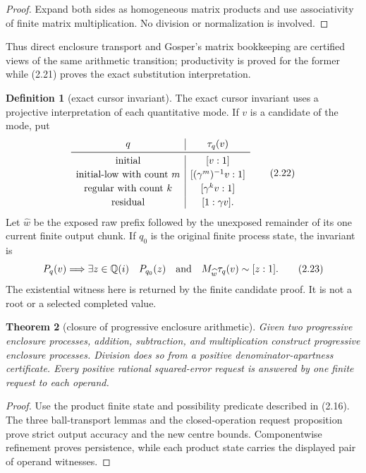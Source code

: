 \documentclass[10pt]{article}
\newtheorem{theorem}{Theorem}[section]
\theoremstyle{definition}
\newtheorem{definition}[theorem]{Definition}
\theoremstyle{remark}
\newcommand{\Qi}{\mathbb{Q}(i)}
\newcommand{\Proj}[2]{[#1:#2]}
\begin{document}
\begin{proof}
Expand both sides as homogeneous matrix products and use associativity of
finite matrix multiplication.  No division or normalization is involved.
\end{proof}

Thus direct enclosure transport and Gosper's matrix bookkeeping are certified
views of the same arithmetic transition; productivity is proved for the
former while (2.21) proves the exact substitution interpretation.

\begin{definition}[exact cursor invariant]
The exact cursor invariant uses a projective interpretation of each
quantitative mode.  If $v$ is a candidate of the mode, put
\[
\begin{array}{c|c}
q&\tau_q(v)\\ \midrule
\text{initial}&\Proj{v}{1}\\[2pt]
\text{initial-low with count }m&\Proj{(\gamma^m)^{-1}v}{1}\\[2pt]
\text{regular with count }k&\Proj{\gamma^k v}{1}\\[2pt]
\text{residual}&\Proj{1}{\gamma v}.
\end{array}
\tag{2.22}
\]
Let $\widehat w$ be the exposed raw prefix followed by the unexposed
remainder of its one current finite output chunk.  If $q_0$ is the original
finite process state, the invariant is
\[
 P_q(v)\Longrightarrow
 \exists z\in\Qi\quad
 P_{q_0}(z)\quad\hbox{and}\quad
 M_{\widehat w}\tau_q(v)\sim\Proj{z}{1}.
\tag{2.23}
\]
The existential witness here is returned by the finite candidate proof.  It
is not a root or a selected completed value.
\end{definition}

\begin{theorem}[closure of progressive enclosure arithmetic]
Given two progressive enclosure processes, addition, subtraction, and
multiplication construct progressive enclosure processes.  Division does so
from a positive denominator-apartness certificate.  Every positive rational
squared-error request is answered by one finite request to each operand.
\end{theorem}

\begin{proof}
Use the product finite state and possibility predicate described in (2.16).
The three ball-transport lemmas and the closed-operation request proposition
prove strict output accuracy and the new centre bounds.  Componentwise refinement proves
persistence, while each product state carries the displayed pair of operand
witnesses.
\end{proof}
\end{document}
